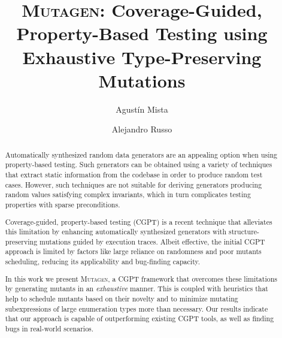 \documentclass[sigconf, anonymous, review]{acmart}
\newcommand{\mutagen}{\textsc{Mutagen}\xspace}
\begin{document}
\title[\mutagen]{\mutagen: Coverage-Guided, Property-Based Testing using
  Exhaustive Type-Preserving Mutations}


\author{Agust\'in Mista}

\author{Alejandro Russo}





\begin{abstract}
Automatically synthesized random data generators are an appealing option when
using property-based testing.
%
Such generators can be obtained using a variety of techniques that extract
static information from the codebase in order to produce random test cases.
%
However, such techniques are not suitable for deriving generators producing
random values satisfying complex invariants, which in turn complicates testing
properties with sparse preconditions.


Coverage-guided, property-based testing (CGPT) is a recent technique that
alleviates this limitation by enhancing automatically synthesized generators
with structure-preserving mutations guided by execution traces.
%
Albeit effective, the initial CGPT approach is limited by factors like large
reliance on randomness and poor mutants scheduling, reducing its applicability
and bug-finding capacity.


In this work we present \mutagen, a CGPT framework that overcomes these
limitations by generating mutants in an \emph{exhaustive} manner.
%
This is coupled with heuristics that help to schedule mutants based on their
novelty and to minimize mutating subexpressions of large enumeration types more
than necessary.
%
Our results indicate that our approach is capable of outperforming existing CGPT
tools, as well as finding bugs in real-world scenarios.
\end{abstract}
\end{document}
